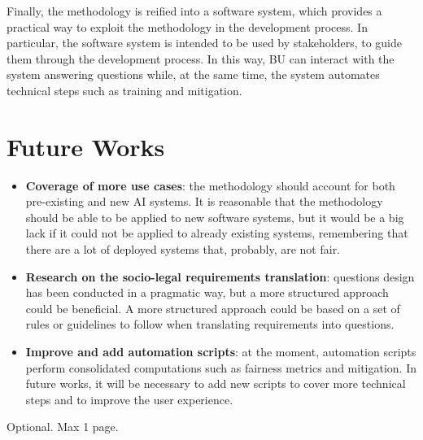 \documentclass[12pt,a4paper,openright,twoside]{book}
\begin{document}
Finally, the methodology is reified into a software system, which provides a practical way to exploit the methodology in the development process.
%
In particular, the software system is intended to be used by stakeholders, to guide them through the development process.
%
In this way, \acl{BU} can interact with the system answering questions while, at the same time, the system automates technical steps such as training and mitigation.
%




\section{Future Works}


\begin{itemize}
    \item \textbf{Coverage of more use cases}: the methodology should account for both pre-existing and new \ac{AI} systems.
    It is reasonable that the methodology should be able to be applied to new software systems, but it would be a big lack if it could not be applied to already existing systems, remembering that there are a lot of deployed systems that, probably, are not fair.

    \item \textbf{Research on the socio-legal requirements translation}: questions design has been conducted in a pragmatic way, but a more structured approach could be beneficial.
    A more structured approach could be based on a set of rules or guidelines to follow when translating requirements into questions.

    \item \textbf{Improve and add automation scripts}: at the moment, automation scripts perform consolidated computations such as fairness metrics and mitigation.
    In future works, it will be necessary to add new scripts to cover more technical steps and to improve the user experience.
\end{itemize}



\backmatter





\begin{acknowledgements} %
Optional. Max 1 page.
\end{acknowledgements}
\end{document}

